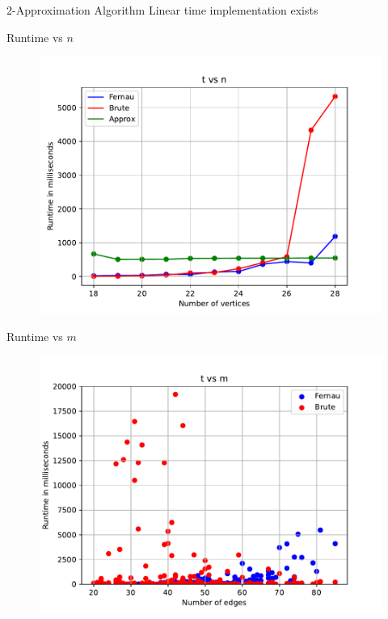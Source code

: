 \documentclass{beamer}
\begin{document}
\begin{frame}{2-Approximation Algorithm}
    Linear time implementation exists 
\end{frame}

\begin{frame}{Runtime vs $n$}
    \begin{figure}
        \centering
        \includegraphics[width=0.9\linewidth]{tvsn.pdf} 
        \label{fig:my_label}
    \end{figure}
\end{frame}

\begin{frame}{Runtime vs $m$}
    \begin{figure}
        \centering
        \includegraphics[width=0.9\linewidth]{tvsm.pdf} 
        \label{fig:my_label}
    \end{figure}
\end{frame}
\end{document}
